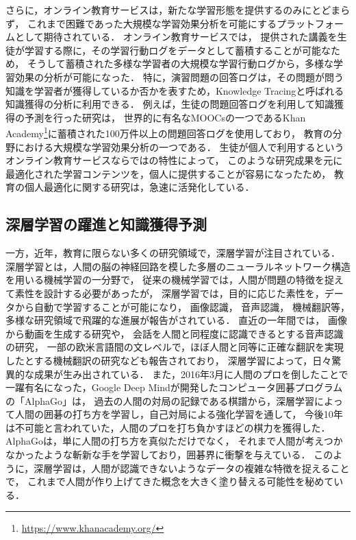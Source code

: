 

さらに，オンライン教育サービスは，新たな学習形態を提供するのみにとどまらず，
これまで困難であった大規模な学習効果分析を可能にするプラットフォームとして期待されている．
オンライン教育サービスでは，
提供された講義を生徒が学習する際に，その学習行動ログをデータとして蓄積することが可能なため，
そうして蓄積された多様な学習者の大規模な学習行動ログから，多様な学習効果の分析が可能になった．
特に，演習問題の回答ログは，その問題が問う知識を学習者が獲得しているか否かを表すため，Knowledge Tracingと呼ばれる知識獲得の分析に利用できる\cite{corbett1994knowledge}．
例えば，生徒の問題回答ログを利用して知識獲得の予測を行った研究\cite{machardy2015toward}は，
世界的に有名なMOOCsの一つであるKhan Academy\footnote{\url{https://www.khanacademy.org/}}に蓄積された100万件以上の問題回答ログを使用しており，
教育の分野における大規模な学習効果分析の一つである．
生徒が個人で利用するというオンライン教育サービスならではの特性によって，
このような研究成果を元に最適化された学習コンテンツを，個人に提供することが容易になったため，
教育の個人最適化に関する研究は，急速に活発化している．


\subsection{深層学習の躍進と知識獲得予測}
一方，近年，教育に限らない多くの研究領域で，深層学習が注目されている．
深層学習とは，人間の脳の神経回路を模した多層のニューラルネットワーク構造を用いる機械学習の一分野で，
従来の機械学習では，人間が問題の特徴を捉えて素性を設計する必要があったが，
深層学習では，目的に応じた素性を，データから自動で学習することが可能になり，
画像認識\cite{schroff2015facenet,szegedy2014going}，
音声認識\cite{hinton2012deep, bahdanau2015end}，
機械翻訳\cite{sutskever2014sequence, dong2015multi}等，
多様な研究領域で飛躍的な進展が報告がされている．
直近の一年間では，
画像から動画を生成する研究\cite{vondrick2016generating}や，
会話を人間と同程度に認識できるとする音声認識の研究\cite{xiong2016achieving}，
一部の欧米言語間の文レベルで，ほぼ人間と同等に正確な翻訳を実現したとする機械翻訳の研究\cite{wu2016google}なども報告されており，
深層学習によって，日々驚異的な成果が生み出されている．
また，2016年3月に人間のプロを倒したことで一躍有名になった，Google Deep Mindが開発したコンピュータ囲碁プログラムの「AlphaGo」\cite{silver2016mastering}は，
過去の人間の対局の記録である棋譜から，深層学習によって人間の囲碁の打ち方を学習し，自己対局による強化学習を通して，
今後10年は不可能と言われていた，人間のプロを打ち負かすほどの棋力を獲得した．
AlphaGoは，単に人間の打ち方を真似ただけでなく，
それまで人間が考えつかなかったような斬新な手を学習しており，囲碁界に衝撃を与えている．
このように，深層学習は，人間が認識できないようなデータの複雑な特徴を捉えることで，
これまで人間が作り上げてきた概念を大きく塗り替える可能性を秘めている．


